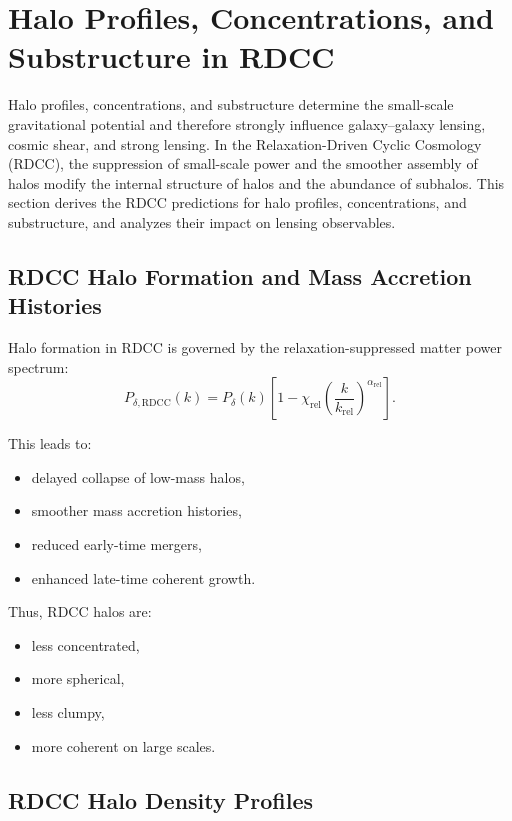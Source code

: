 \documentclass[11pt,a4paper]{article}
\begin{document}
\section{Halo Profiles, Concentrations, and Substructure in RDCC}

Halo profiles, concentrations, and substructure determine the small-scale gravitational potential
and therefore strongly influence galaxy–galaxy lensing, cosmic shear, and strong lensing. In the
Relaxation-Driven Cyclic Cosmology (RDCC), the suppression of small-scale power and the
smoother assembly of halos modify the internal structure of halos and the abundance of
subhalos. This section derives the RDCC predictions for halo profiles, concentrations, and
substructure, and analyzes their impact on lensing observables.

\subsection{RDCC Halo Formation and Mass Accretion Histories}

Halo formation in RDCC is governed by the relaxation-suppressed matter power spectrum:
\begin{equation}
P_{\delta,\mathrm{RDCC}}(k)
=
P_{\delta}(k)
\left[
1
-
\chi_{\mathrm{rel}}
\left(
\frac{k}{k_{\mathrm{rel}}}
\right)^{\alpha_{\mathrm{rel}}}
\right].
\end{equation}

This leads to:
\begin{itemize}
\item delayed collapse of low-mass halos,
\item smoother mass accretion histories,
\item reduced early-time mergers,
\item enhanced late-time coherent growth.
\end{itemize}

Thus, RDCC halos are:
\begin{itemize}
\item less concentrated,
\item more spherical,
\item less clumpy,
\item more coherent on large scales.
\end{itemize}

\subsection{RDCC Halo Density Profiles}
\end{document}
